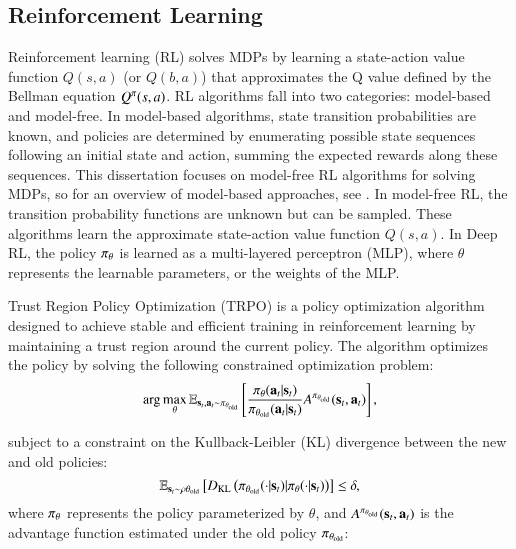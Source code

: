 \subsection{Reinforcement Learning}
\label{sec:back:rl}
Reinforcement learning (RL) solves MDPs by learning a state-action value function $Q(s,a)$ (or $Q(b,a)$) that approximates the Q value defined by the Bellman equation $Q^\pi(s,a)$. RL algorithms fall into two categories: model-based and model-free. In model-based algorithms, state transition probabilities are known, and policies are determined by enumerating possible state sequences following an initial state and action, summing the expected rewards along these sequences. This dissertation focuses on model-free RL algorithms for solving MDPs, so for an overview of model-based approaches, see \cite{moerland2023model, polydoros2017survey}. In model-free RL, the transition probability functions are unknown but can be sampled. These algorithms learn the approximate state-action value function $Q(s,a)$. In Deep RL, the policy $\pi_\theta$ is learned as a multi-layered perceptron (MLP), where $\theta$ represents the learnable parameters, or the weights of the MLP.

Trust Region Policy Optimization (TRPO) \cite{schulman2015trust} is a policy optimization algorithm designed to achieve stable and efficient training in reinforcement learning by maintaining a trust region around the current policy. The algorithm optimizes the policy by solving the following constrained optimization problem:
\begin{equation}
\label{eq:trpo}
\arg\max_{\theta} \mathbb{E}_{\mathbf{s}_t,\mathbf{a}_t \sim \pi_{\theta_{\text{old}}}} \left[ \frac{\pi_{\theta}(\mathbf{a}_t|\mathbf{s}_t)}{\pi_{\theta_{\text{old}}}(\mathbf{a}_t|\mathbf{s}_t)} A^{\pi_{\theta_{\text{old}}}}(\mathbf{s}_t,\mathbf{a}_t) \right],
\end{equation}

subject to a constraint on the Kullback-Leibler (KL) divergence between the new and old policies:
\begin{equation}
\label{eq:trpo_kl}
\mathbb{E}_{\mathbf{s}_t \sim \rho{\theta_{\text{old}}}} \left[ D_{\text{KL}} \left( \pi_{\theta_{\text{old}}}(\cdot|\mathbf{s}_t) | \pi_{\theta}(\cdot|\mathbf{s}_t) \right) \right] \leq \delta,
\end{equation}
where $\pi_{\theta}$ represents the policy parameterized by $\theta$, and $A^{\pi_{\theta_{\text{old}}}}(\mathbf{s}_t,\mathbf{a}_t)$ is the advantage function estimated under the old policy $\pi_{\theta_{\text{old}}}$:

